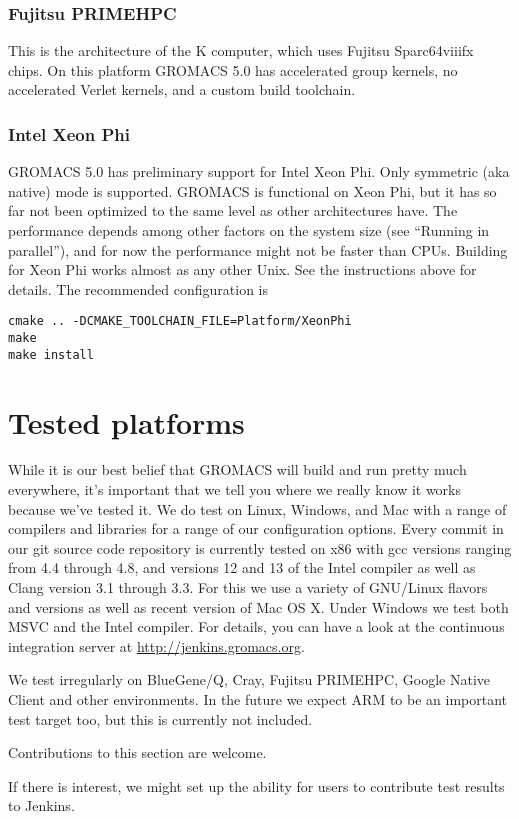 \documentclass{article}[12pt,a4paper,twoside]
\newcommand{\gromacs}{GROMACS}
\newcommand{\gromacsversion}{5.0}
\begin{document}
\subsubsection{Fujitsu PRIMEHPC}

This is the architecture of the K computer, which uses Fujitsu
Sparc64viiifx chips. On this platform \gromacs{} \gromacsversion{} has
accelerated group kernels, no accelerated Verlet kernels, and a custom
build toolchain.

\subsubsection{Intel Xeon Phi}

\gromacs{} 5.0 has preliminary support for Intel Xeon Phi. Only symmetric
(aka native) mode is supported. \gromacs{} is functional on Xeon Phi,
but it has so far not been optimized to the same level as other
architectures have. The performance depends among other factors on the
system size (see ``Running in parallel''), and for now the performance
might not be faster than CPUs. Building for Xeon Phi works almost as any
other Unix. See the instructions above for details. The recommended
configuration is
\begin{verbatim}
cmake .. -DCMAKE_TOOLCHAIN_FILE=Platform/XeonPhi
make
make install
\end{verbatim}

\section{Tested platforms}

While it is our best belief that \gromacs{} will build and run pretty
much everywhere, it's important that we tell you where we really know
it works because we've tested it. We do test on Linux, Windows, and
Mac with a range of compilers and libraries for a range of our
configuration options. Every commit in our git source code
repository is currently tested on x86 with gcc versions ranging
from 4.4 through 4.8, and versions 12 and 13 of the Intel compiler as 
well as Clang version 3.1 through 3.3. For this we use a variety of GNU/Linux
flavors and versions as well as recent version of Mac OS X.
Under Windows we test both MSVC and the Intel compiler. For details, you can
have a look at the continuous integration server at \url{http://jenkins.gromacs.org}.

We test irregularly on BlueGene/Q, Cray,
Fujitsu PRIMEHPC, Google Native Client and other environments. In
the future we expect ARM to be an important test target too, but this
is currently not included.

Contributions to this section are welcome.

If there is interest, we might set up the ability for users to
contribute test results to Jenkins.
\end{document}
